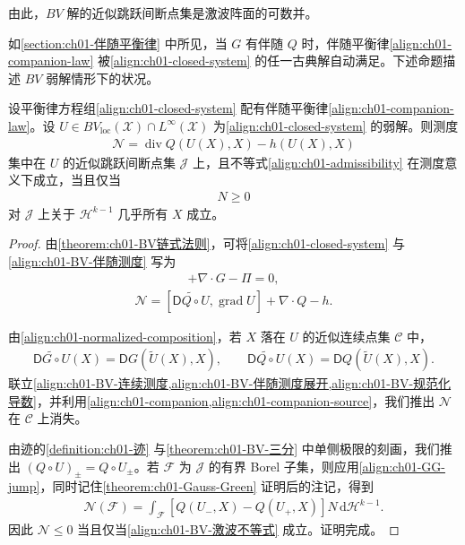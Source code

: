 \documentclass[../../main.tex]{subfiles}
\begin{document}
由此，$BV$ 解的近似跳跃间断点集是激波阵面的可数并。

如\cref{section:ch01-伴随平衡律} 中所见，当 $G$ 有伴随 $Q$ 时，伴随平衡律\cref{align:ch01-companion-law} 被\cref{align:ch01-closed-system} 的任一古典解自动满足。下述命题描述 $BV$ 弱解情形下的状况。

\begin{theorem}\label{theorem:ch01-BV伴随不等式}
设平衡律方程组\cref{align:ch01-closed-system} 配有伴随平衡律\cref{align:ch01-companion-law}。设 $U\in BV_{\mathrm{loc}}(\mathscr{X})\cap L^{\infty}(\mathscr{X})$ 为\cref{align:ch01-closed-system} 的弱解。则测度
\begin{align}
\mathscr{N}=\operatorname{div} Q(U(X),X)-h(U(X),X)\label{align:ch01-BV-伴随测度}
\end{align}
集中在 $U$ 的近似跳跃间断点集 $\mathscr{J}$ 上，且不等式\cref{align:ch01-admissibility} 在测度意义下成立，当且仅当
\begin{align}
[Q(U_{+},X)-Q(U_{-},X)]N\geqslant 0\label{align:ch01-BV-激波不等式}
\end{align}
对 $\mathscr{J}$ 上关于 $\mathscr{H}^{k-1}$ 几乎所有 $X$ 成立。
\end{theorem}

\begin{proof}
由\cref{theorem:ch01-BV链式法则}，可将\cref{align:ch01-closed-system} 与\cref{align:ch01-BV-伴随测度} 写为
\begin{align}
[\widetilde{\mathsf{D}G\circ U},\operatorname{grad}U]+\nabla\cdot G-\Pi=0,\label{align:ch01-BV-连续测度}
\end{align}
\begin{align}
\mathscr{N}=[\widetilde{\mathsf{D}Q\circ U},\operatorname{grad}U]+\nabla\cdot Q-h.\label{align:ch01-BV-伴随测度展开}
\end{align}

由\cref{align:ch01-normalized-composition}，若 $X$ 落在 $U$ 的近似连续点集 $\mathscr{C}$ 中，
\begin{align}
\widetilde{\mathsf{D}G\circ U}(X)=\mathsf{D}G(\tilde{U}(X),X),\qquad
\widetilde{\mathsf{D}Q\circ U}(X)=\mathsf{D}Q(\tilde{U}(X),X).\label{align:ch01-BV-规范化导数}
\end{align}
联立\cref{align:ch01-BV-连续测度,align:ch01-BV-伴随测度展开,align:ch01-BV-规范化导数}，并利用\cref{align:ch01-companion,align:ch01-companion-source}，我们推出 $\mathscr{N}$ 在 $\mathscr{C}$ 上消失。

由迹的\cref{definition:ch01-迹} 与\cref{theorem:ch01-BV-三分} 中单侧极限的刻画，我们推出 $(Q\circ U)_{\pm}=Q\circ U_{\pm}$。若 $\mathscr{F}$ 为 $\mathscr{J}$ 的有界 Borel 子集，则应用\cref{align:ch01-GG-jump}，同时记住\cref{theorem:ch01-Gauss-Green} 证明后的注记，得到
\begin{align}
\mathscr{N}(\mathscr{F})=\int_{\mathscr{F}}[Q(U_{-},X)-Q(U_{+},X)]N\,\mathrm{d}\mathscr{H}^{k-1}.\label{align:ch01-BV-伴随跳测度}
\end{align}
因此 $\mathscr{N}\leqslant 0$ 当且仅当\cref{align:ch01-BV-激波不等式} 成立。证明完成。
\end{proof}
\end{document}
